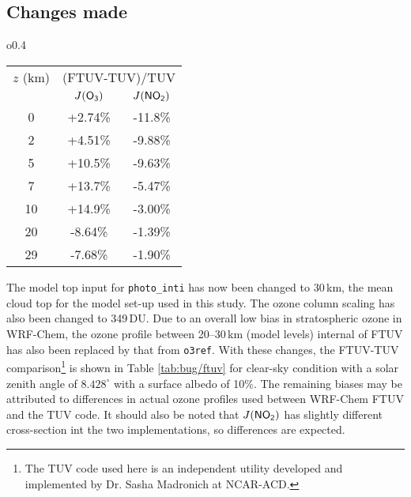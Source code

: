 \subsection{Changes made}\label{a-ssec:bug/ftuv/fix}
	\begin{wraptable}{o}{0.4\textwidth}
	\vspace{-.5in}
		\begin{singlespacing}
		\caption{Compaison of photolysis rates from FTUV and TUV.}
		\begin{center}
		\begin{tabular}{c|cc} \hline
		$z$ (\unit{km}) & \multicolumn{2}{c}{(FTUV-TUV)/TUV} \\ 
		 & \hspace{.15in}$J(\chem{O_3})$\hspace{.15in} & \hspace{.15in}$J(\chem{NO_2})$\hspace{.15in}  \\ \hline\hline
		0	& +2.74\% & -11.8\% \\
		2	& +4.51\% & -9.88\% \\
		5	& +10.5\% & -9.63\% \\
		7	& +13.7\% & -5.47\% \\
		10	& +14.9\% & -3.00\% \\
		20	& -8.64\% & -1.39\% \\
		29	& -7.68\% & -1.90\% \\ \hline
		\end{tabular}
		\label{tab:bug/ftuv}
		\end{center}
		\end{singlespacing}
	\vspace{-.1in}
	\end{wraptable}

	The model top input for \texttt{photo\_inti} has now been changed to 30\,\unit{km}, the mean cloud top for the model set-up used in this study. The ozone column scaling has also been changed to 349\,\unit{DU}. Due to an overall low bias in stratospheric ozone in WRF-Chem, the ozone profile between 20--30\,\unit{km} (model levels) internal of FTUV has also been replaced by that from \texttt{o3ref}. With these changes, the FTUV-TUV comparison\footnote{The TUV code used here is an independent utility developed and implemented by Dr. Sasha Madronich at NCAR-ACD.} is shown in Table \ref{tab:bug/ftuv} for clear-sky condition with a solar zenith angle of $8.428^\circ$ with a surface albedo of 10\%. The remaining biases may be attributed to differences in actual ozone profiles used between WRF-Chem FTUV and the TUV code. It should also be noted that $J(\chem{NO_2})$ has slightly different cross-section int the two implementations, so differences are expected.

